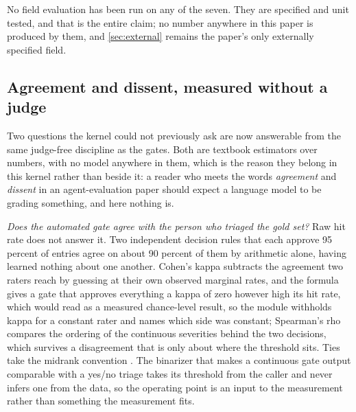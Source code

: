 No field evaluation has been run on any of the seven. They are specified and unit tested, and that is the entire claim; no number anywhere in this paper is produced by them, and \cref{sec:external} remains the paper's only externally specified field.

\subsection{Agreement and dissent, measured without a judge}\label{sec:agreement}

Two questions the kernel could not previously ask are now answerable from the same judge-free discipline as the gates. Both are textbook estimators over numbers, with no model anywhere in them, which is the reason they belong in this kernel rather than beside it: a reader who meets the words \emph{agreement} and \emph{dissent} in an agent-evaluation paper should expect a language model to be grading something, and here nothing is.

\emph{Does the automated gate agree with the person who triaged the gold set?} Raw hit rate does not answer it. Two independent decision rules that each approve 95 percent of entries agree on about 90 percent of them by arithmetic alone, having learned nothing about one another. Cohen's kappa \citep{cohen1960kappa} subtracts the agreement two raters reach by guessing at their own observed marginal rates, and the formula gives a gate that approves everything a kappa of zero however high its hit rate, which would read as a measured chance-level result, so the module withholds kappa for a constant rater and names which side was constant; Spearman's rho \citep{spearman1904proof} compares the ordering of the continuous severities behind the two decisions, which survives a disagreement that is only about where the threshold sits. Ties take the midrank convention \citep{kendall1948methods}. The binarizer that makes a continuous gate output comparable with a yes/no triage takes its threshold from the caller and never infers one from the data, so the operating point is an input to the measurement rather than something the measurement fits.

